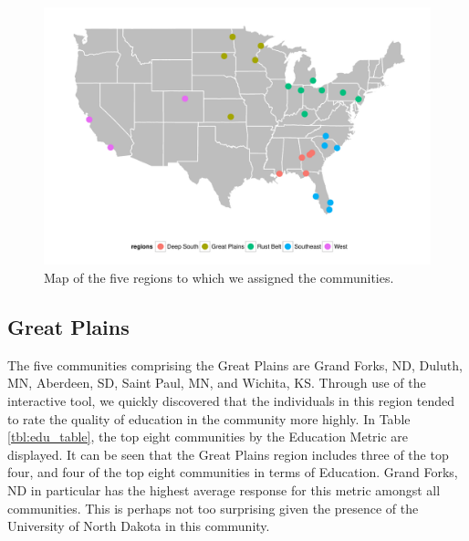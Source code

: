 \documentclass[11pt]{article}\usepackage{knitr}
\begin{document}
\begin{knitrout}
\color{fgcolor}\begin{figure}[H]


{\centering \includegraphics[width=\textwidth]{figure/region_map} 

}

\caption[Map of the five regions to which we assigned the communities]{Map of the five regions to which we assigned the communities.\label{fig:region_map}}
\end{figure}


\end{knitrout}


\subsection*{Great Plains}
The five communities comprising the Great Plains are Grand Forks, ND, Duluth, MN, Aberdeen, SD, Saint Paul, MN, and Wichita, KS. Through use of the interactive tool, we quickly discovered that the individuals in this region tended to rate the quality of education in the community more highly. In Table \ref{tbl:edu_table}, the top eight communities by the Education Metric are displayed. It can be seen that the Great Plains region includes three of the top four, and four of the top eight communities in terms of Education. Grand Forks, ND in particular has the highest average response for this metric amongst all communities. This is perhaps not too surprising given the presence of the University of North Dakota in this community.
\end{document}
